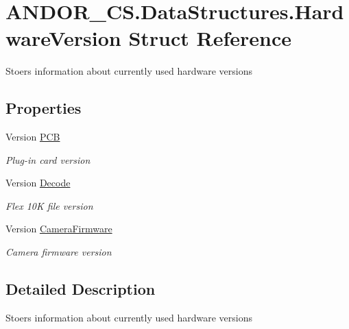 \hypertarget{struct_a_n_d_o_r___c_s_1_1_data_structures_1_1_hardware_version}{}\section{A\+N\+D\+O\+R\+\_\+\+C\+S.\+Data\+Structures.\+Hardware\+Version Struct Reference}
\label{struct_a_n_d_o_r___c_s_1_1_data_structures_1_1_hardware_version}


Stoers information about currently used hardware versions  


\subsection*{Properties}
\begin{DoxyCompactItemize}
\item 
Version \hyperlink{struct_a_n_d_o_r___c_s_1_1_data_structures_1_1_hardware_version_a09254787487605bd5c7d75ff0ca167e7}{P\+CB}
\begin{DoxyCompactList}\small\item\em Plug-\/in card version \end{DoxyCompactList}\item 
Version \hyperlink{struct_a_n_d_o_r___c_s_1_1_data_structures_1_1_hardware_version_a752eb2019b2042cb43a0adccb81fee3f}{Decode}
\begin{DoxyCompactList}\small\item\em Flex 10K file version \end{DoxyCompactList}\item 
Version \hyperlink{struct_a_n_d_o_r___c_s_1_1_data_structures_1_1_hardware_version_a41272292a6d073032bf6fd3f25924e72}{Camera\+Firmware}
\begin{DoxyCompactList}\small\item\em Camera firmware version \end{DoxyCompactList}\end{DoxyCompactItemize}


\subsection{Detailed Description}
Stoers information about currently used hardware versions 



